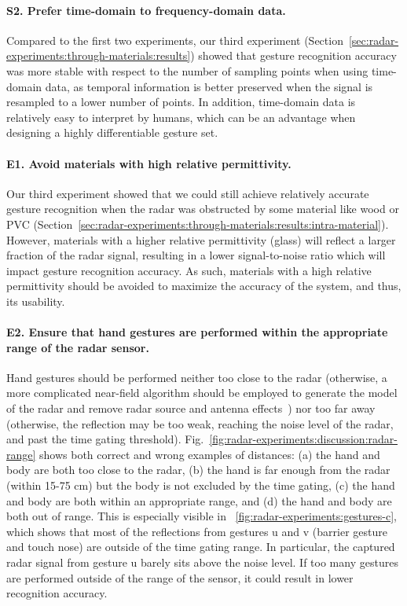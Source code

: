 \paragraph{S2. Prefer time-domain to frequency-domain data.}
Compared to the first two experiments, our third experiment (Section~\ref{sec:radar-experiments:through-materials:results}) showed that gesture recognition accuracy was more stable with respect to the number of sampling points when using time-domain data, as temporal information is better preserved when the signal is resampled to a lower number of points. In addition, time-domain data is relatively easy to interpret by humans, which can be an advantage when designing a highly differentiable gesture set.

\paragraph{E1. Avoid materials with high relative permittivity.} 
Our third experiment showed that we could still achieve relatively accurate gesture recognition when the radar was obstructed by some material like wood or PVC (Section~\ref{sec:radar-experiments:through-materials:results:intra-material}). 
%
However, materials with a higher relative permittivity (\eg glass) will reflect a larger fraction of the radar signal, resulting in a lower signal-to-noise ratio which will impact gesture recognition accuracy. 
%
As such, materials with a high relative permittivity should be avoided to maximize the accuracy of the system, and thus, its usability.

\paragraph{E2. Ensure that hand gestures are performed within the appropriate range of the radar sensor.}
Hand gestures should be performed neither too close to the radar (otherwise, a more complicated near-field algorithm should be employed to generate the model of the radar and remove radar source and antenna effects~\cite{Lambot:2014}) nor too far away (otherwise, the reflection may be too weak, reaching the noise level of the radar, and past the time gating threshold). Fig.~\ref{fig:radar-experiments:discussion:radar-range} shows both correct and wrong examples of distances: (a) the hand and body are both too close to the radar, (b) the hand is far enough from the radar (within 15-75 cm) but the body is not excluded by the time gating, (c) the hand and body are both within an appropriate range, and (d) the hand and body are both out of range. This is especially visible in \fig~\ref{fig:radar-experiments:gestures-c}, which shows that most of the reflections from gestures u and v (barrier gesture and touch nose) are outside of the time gating range. In particular, the captured radar signal from gesture u barely sits above the noise level. If too many gestures are performed outside of the range of the sensor, it could result in lower recognition accuracy.

